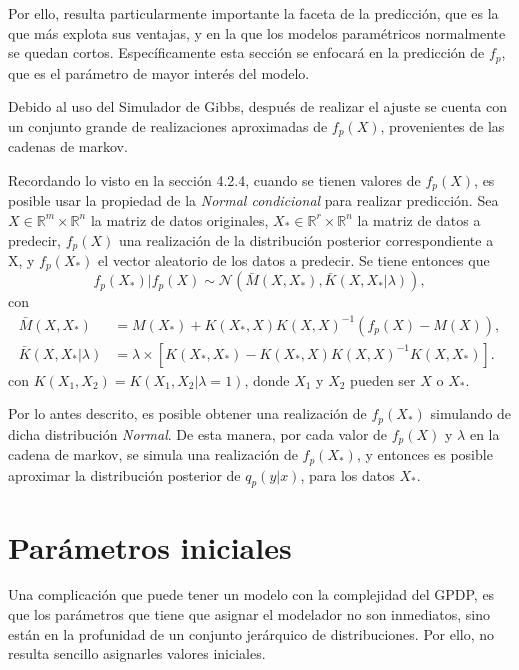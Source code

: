 Por ello, resulta particularmente importante la faceta de la predicci\'on, que es la que m\'as explota sus ventajas, y en la que los modelos param\'etricos normalmente se quedan cortos. Espec\'ificamente esta secci\'on se enfocar\'a en la predicci\'on de $f_p$, que es el par\'ametro de mayor inter\'es del modelo.

Debido al uso del Simulador de Gibbs, despu\'es de realizar el ajuste se cuenta con un conjunto grande de realizaciones aproximadas de $f_p(X)$, provenientes de las cadenas de markov.

Recordando lo visto en la secci\'on 4.2.4, cuando se tienen valores de $f_p(X)$, es posible usar la propiedad de la \textit{Normal condicional} para realizar predicci\'on. Sea $X \in \mathbb{R}^m \times \mathbb{R}^n$ la matriz de datos originales, $X_* \in \mathbb{R}^r \times \mathbb{R}^n$ la matriz de datos a predecir, $f_p(X)$ una realizaci\'on de la distribuci\'on posterior correspondiente a X, y $f_p(X_*)$ el vector aleatorio de los datos a predecir. Se tiene entonces que 
\begin{equation*}
    f_p(X_*)|f_p(X) 
    \sim \mathcal{N}
    (\bar{M}(X,X_*),\bar{K}(X,X_*|\lambda)),
\end{equation*}
con
\begin{equation*}
\begin{aligned}
    \bar{M}(X,X_*) &= M(X_*) + K(X_*,X)K(X,X)^{-1}(f_p(X) - M(X)), \\
    \bar{K}(X,X_*|\lambda) &= 
    \lambda
    \times
    \left[
    K(X_*,X_*) -
    K(X_*,X)K(X,X)^{-1}K(X,X_*)
    \right]
    .
\end{aligned}
\end{equation*}
con $K(X_1,X_2) = K(X_1,X_2|\lambda=1)$, donde $X_1$ y $X_2$ pueden ser $X$ o $X_*$.

Por lo antes descrito, es posible obtener una realizaci\'on de $f_p(X_*)$ simulando de dicha distribuci\'on \textit{Normal}. De esta manera, por cada valor de $f_p(X)$ y $\lambda$ en la cadena de markov, se simula una realizaci\'on de $f_p(X_*)$, y entonces es posible aproximar la distribuci\'on posterior de $q_p(y|x)$, para los datos $X_*$.

\section{Par\'ametros iniciales}

Una complicaci\'on que puede tener un modelo con la complejidad del GPDP, es que los par\'ametros que tiene que asignar el modelador no son inmediatos, sino est\'an en la profunidad de un conjunto jer\'arquico de distribuciones. Por ello, no resulta sencillo asignarles valores iniciales.

